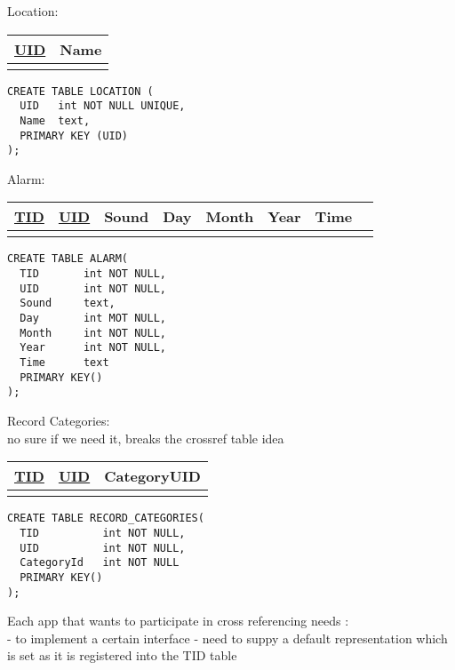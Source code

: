 \noindent
Location: \\ 		
\begin{tabular}[ht]{|l|l|}
\hline
\underline{UID} & Name  \\
\hline
 &  \\
\hline
\end{tabular}
\begin{verbatim}
CREATE TABLE LOCATION (
  UID   int NOT NULL UNIQUE,
  Name  text,
  PRIMARY KEY (UID)
);
\end{verbatim} 


\noindent
Alarm: \\
\begin{tabular}[ht]{|l|l|l|l|l|l|l|l|}
\hline
\underline{TID} & \underline{UID} & Sound & Day & Month & Year & Time \\
\hline
 & & & & & & \\
\hline
\end{tabular}
\begin{verbatim}
CREATE TABLE ALARM(
  TID       int NOT NULL,
  UID       int NOT NULL,
  Sound     text,
  Day       int MOT NULL,
  Month     int NOT NULL,
  Year      int NOT NULL,
  Time      text
  PRIMARY KEY() 
);
\end{verbatim}

\noindent
Record Categories: \\
no sure if we need it, breaks the crossref table idea \\
\begin{tabular}[ht]{|l|l|l|}
\hline
\underline{TID} & \underline{UID} & CategoryUID\\
\hline
 & &\\
\hline
\end{tabular}
\begin{verbatim}
CREATE TABLE RECORD_CATEGORIES(
  TID          int NOT NULL,
  UID          int NOT NULL,
  CategoryId   int NOT NULL
  PRIMARY KEY() 
);
\end{verbatim}
\pagebreak

\noindent
Each app that wants to participate in cross referencing needs : \\
- to implement a certain interface
- need to suppy a default representation which is set as it is registered into the TID table

